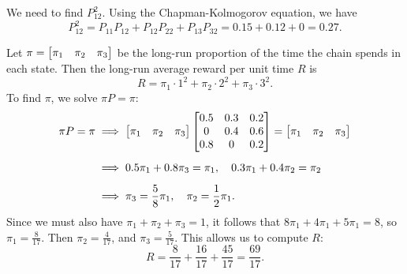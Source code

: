 \documentclass{homework}
\begin{document}
	\begin{alphaparts}
		\questionpart We need to find $P^2_{12}$. Using the Chapman-Kolmogorov equation, we have
		\begin{equation*}
			P^2_{12} = P_{11}P_{12} + P_{12}P_{22} + P_{13}P_{32} = 0.15 + 0.12 + 0 = 0.27.
		\end{equation*}		
		
		\questionpart Let $\pi = \left[\begin{matrix}\pi_1 & \pi_2 & \pi_3\end{matrix}\right]$ be the long-run proportion of the time the chain spends in each state. Then the long-run average reward per unit time $R$ is
		\begin{equation*}
			R = \pi_1 \cdot 1^2 + \pi_2 \cdot 2^2 + \pi_3 \cdot 3^2.
		\end{equation*}
		To find $\pi$, we solve $\pi P = \pi$:
		\begin{align*}
			\pi P = \pi &\implies \left[\begin{matrix}\pi_1 & \pi_2 &\pi_3\end{matrix}\right] \left[\begin{matrix}0.5 & 0.3 &0.2 \\ 0 & 0.4 & 0.6 \\ 0.8 & 0 & 0.2\end{matrix}\right] = \left[\begin{matrix}\pi_1 & \pi_2 &\pi_3\end{matrix}\right] \\[0.5em]
			&\implies 0.5\pi_1 + 0.8\pi_3 = \pi_1, \quad 0.3\pi_1 + 0.4\pi_2 = \pi_2 \\[0.5em]
			&\implies \pi_3 = \frac{5}{8}\pi_1, \quad \pi_2 = \frac{1}{2}\pi_1.
		\end{align*}
		Since we must also have $\pi_1 + \pi_2 + \pi_3 = 1$, it follows that $8\pi_1 + 4\pi_1 + 5\pi_1 = 8$, so $\pi_1 = \frac{8}{17}$. Then $\pi_2 = \frac{4}{17}$, and $\pi_3 = \frac{5}{17}$. This allows us to compute $R$:
		\begin{equation*}
			R = \frac{8}{17} + \frac{16}{17} + \frac{45}{17} = \frac{69}{17}.
		\end{equation*}
		

\end{alphaparts}
\end{document}
